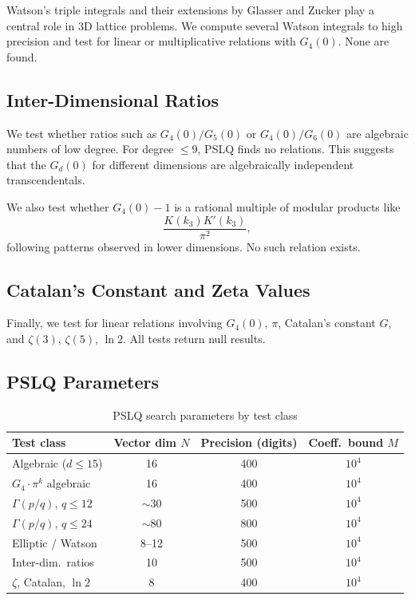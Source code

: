 \documentclass[12pt,a4paper]{article}
\numberwithin{equation}{section}
\theoremstyle{plain}
\theoremstyle{definition}
\theoremstyle{remark}
\begin{document}
Watson's triple integrals \cite{Watson1939} and their extensions by Glasser and Zucker \cite{GlasserZucker1977}
play a central role in 3D lattice problems. We compute several Watson integrals to high precision
and test for linear or multiplicative relations with $G_4(0)$. None are found.

\subsection{Inter-Dimensional Ratios}

We test whether ratios such as $G_4(0) / G_5(0)$ or $G_4(0) / G_6(0)$ are algebraic numbers of low degree.
For degree $\leq 9$, PSLQ finds no relations. This suggests that the $G_d(0)$ for different dimensions
are algebraically independent transcendentals.

We also test whether $G_4(0) - 1$ is a rational multiple of modular products like
\[
  \frac{K(k_3) K'(k_3)}{\pi^2},
\]
following patterns observed in lower dimensions. No such relation exists.

\subsection{Catalan's Constant and Zeta Values}

Finally, we test for linear relations involving $G_4(0)$, $\pi$, Catalan's constant $G$,
and $\zeta(3)$, $\zeta(5)$, $\ln 2$. All tests return null results.

\subsection{PSLQ Parameters}

\begin{table}[H]
\centering
\caption{PSLQ search parameters by test class}
\label{tab:pslq-params}
\begin{tabular}{@{}lccc@{}}
\toprule
\textbf{Test class} & \textbf{Vector dim $N$} & \textbf{Precision (digits)} & \textbf{Coeff.\ bound $M$} \\
\midrule
Algebraic ($d \leq 15$) & 16 & 400 & $10^4$ \\
$G_4 \cdot \pi^k$ algebraic & 16 & 400 & $10^4$ \\
$\Gamma(p/q)$, $q \leq 12$ & $\sim 30$ & 500 & $10^4$ \\
$\Gamma(p/q)$, $q \leq 24$ & $\sim 80$ & 800 & $10^4$ \\
Elliptic / Watson & 8--12 & 500 & $10^4$ \\
Inter-dim.\ ratios & 10 & 500 & $10^4$ \\
$\zeta$, Catalan, $\ln 2$ & 8 & 400 & $10^4$ \\
\bottomrule
\end{tabular}
\end{table}
\end{document}
